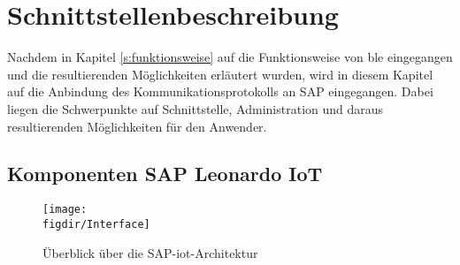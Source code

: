 \section{Schnittstellenbeschreibung}
\label{s:interface} 

\noindent Nachdem in Kapitel \ref{s:funktionsweise} auf die Funktionsweise von \ac{ble} eingegangen und die resultierenden Möglichkeiten erläutert wurden, wird in diesem Kapitel auf die Anbindung des Kommunikationsprotokolls an SAP eingegangen. Dabei liegen die Schwerpunkte auf Schnittstelle, Administration und daraus resultierenden Möglichkeiten für den Anwender.\\

\subsection{Komponenten SAP Leonardo IoT}
\label{ss:interface:sap}

\begin{figure}[!b]
	\centering
	\texttt{[image: \\figdir/Interface]}
	\caption[Überblick über die SAP-\ac{iot}-Architektur]{Überblick über die SAP-\ac{iot}-Architektur \cite[Seiten 117, 164, 181, 184, 201, 208, 221]{Holtschulte20:IOS}}
	\label{FIG:Interface}
\end{figure}


